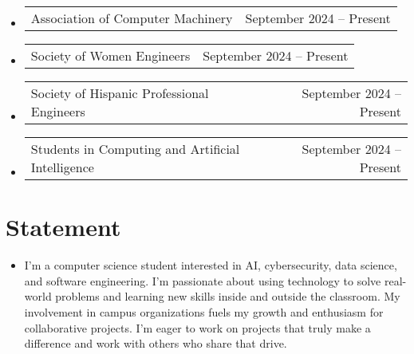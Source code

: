\documentclass[letterpaper,11pt]{article}
\makeatletter
\newcommand{\resumeItem}[1]{
  \item\small{
    {#1 \vspace{-2pt}}
  }
}
\newcommand{\resumeProjectHeading}[2]{
    \item
    \begin{tabular*}{0.97\textwidth}{l@{\extracolsep{\fill}}r}
      \small#1 & #2 \\
    \end{tabular*}\vspace{-7pt}
}
\newcommand{\resumeSubHeadingListStart}{\begin{itemize}[leftmargin=0.15in, label={}]}
\newcommand{\resumeSubHeadingListEnd}{\end{itemize}}
\makeatother
\begin{document}
\resumeSubHeadingListStart
\resumeProjectHeading
    {{Association of Computer Machinery} \emph}{September 2024 -- Present}
\resumeProjectHeading
    {{Society of Women Engineers} \emph}{September 2024 -- Present}
\resumeProjectHeading
    {{Society of Hispanic Professional Engineers} \emph}{September 2024 -- Present}  
\resumeProjectHeading
    {{Students in Computing and Artificial Intelligence} \emph}{September 2024 -- Present}
\resumeSubHeadingListEnd

\section{Statement}
\resumeSubHeadingListStart
    \resumeItem{I'm a computer science student interested in AI, cybersecurity, data science, and software engineering. I’m passionate 
    about using technology to solve real-world problems and learning new skills inside and outside the classroom. 
    My involvement in campus organizations fuels my growth and enthusiasm for collaborative projects. I’m eager to work on projects 
    that truly make a difference and work with others who share that drive.
    }
\resumeSubHeadingListEnd

\end{document}
